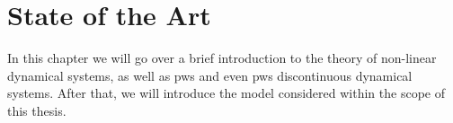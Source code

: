 \chapter{State of the Art}
\label{chap:state}

In this chapter we will go over a brief introduction to the theory of non-linear dynamical systems, as well as \gls{pws} and even \gls{pws} discontinuous dynamical systems.
After that, we will introduce the model considered within the scope of this thesis.






%

